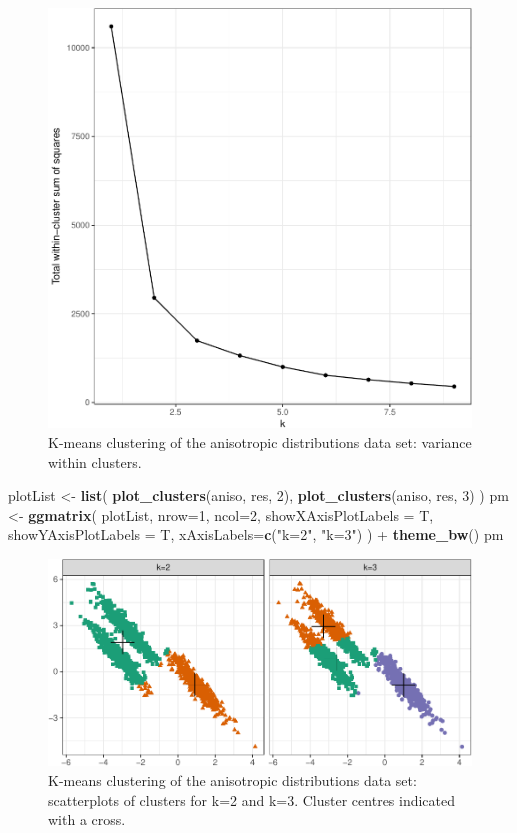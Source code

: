 \documentclass[]{book}
\newenvironment{Shaded}{\begin{snugshade}}{\end{snugshade}}
\newcommand{\KeywordTok}[1]{\textcolor[rgb]{0.13,0.29,0.53}{\textbf{{#1}}}}
\newcommand{\DataTypeTok}[1]{\textcolor[rgb]{0.13,0.29,0.53}{{#1}}}
\newcommand{\DecValTok}[1]{\textcolor[rgb]{0.00,0.00,0.81}{{#1}}}
\newcommand{\StringTok}[1]{\textcolor[rgb]{0.31,0.60,0.02}{{#1}}}
\newcommand{\NormalTok}[1]{{#1}}
\theoremstyle{definition}
\theoremstyle{definition}
\theoremstyle{definition}
\theoremstyle{remark}
\begin{document}
\begin{figure}

{\centering \includegraphics[width=0.5\linewidth]{09-clustering_files/figure-latex/kmeansAnisoElbow-1} 

}

\caption{K-means clustering  of the anisotropic distributions data set: variance within clusters.}\label{fig:kmeansAnisoElbow}
\end{figure}

\begin{Shaded}
\begin{Highlighting}[]
\NormalTok{plotList <-}\StringTok{ }\KeywordTok{list}\NormalTok{(}
  \KeywordTok{plot_clusters}\NormalTok{(aniso, res, }\DecValTok{2}\NormalTok{),}
  \KeywordTok{plot_clusters}\NormalTok{(aniso, res, }\DecValTok{3}\NormalTok{)}
\NormalTok{)}
\NormalTok{pm <-}\StringTok{ }\KeywordTok{ggmatrix}\NormalTok{(}
  \NormalTok{plotList, }\DataTypeTok{nrow=}\DecValTok{1}\NormalTok{, }\DataTypeTok{ncol=}\DecValTok{2}\NormalTok{, }\DataTypeTok{showXAxisPlotLabels =} \NormalTok{T, }
  \DataTypeTok{showYAxisPlotLabels =} \NormalTok{T, }\DataTypeTok{xAxisLabels=}\KeywordTok{c}\NormalTok{(}\StringTok{"k=2"}\NormalTok{, }\StringTok{"k=3"}\NormalTok{)}
\NormalTok{) +}\StringTok{ }\KeywordTok{theme_bw}\NormalTok{()}
\NormalTok{pm}
\end{Highlighting}
\end{Shaded}

\begin{figure}

{\centering \includegraphics[width=1\linewidth]{09-clustering_files/figure-latex/kmeansAnisoScatter-1} 

}

\caption{K-means clustering of the anisotropic distributions data set: scatterplots of clusters for k=2 and k=3. Cluster centres indicated with a cross.}\label{fig:kmeansAnisoScatter}
\end{figure}
\end{document}
